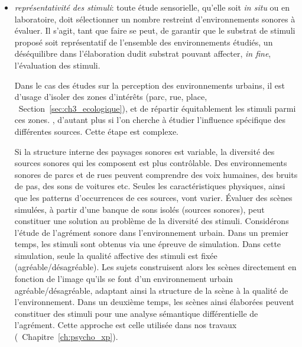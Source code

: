 \begin{itemize}
\item \emph{représentativité des stimuli}: toute étude sensorielle, qu'elle soit \emph{in situ} ou en laboratoire, doit sélectionner un nombre restreint d'environnements sonores à évaluer. Il s'agit, tant que faire se peut, de garantir que le substrat de stimuli proposé soit représentatif de l'ensemble des environnements étudiés, un déséquilibre dans l'élaboration dudit substrat pouvant affecter, \emph{in fine}, l'évaluation des stimuli. 

Dans le cas des études sur la perception des environnements urbains, il est d'usage d'isoler des zones d’intérêts (parc, rue, place, \cf~Section~\ref{sec:ch3_ecologique}), et de répartir équitablement les stimuli parmi ces zones. , d'autant plus si l'on cherche à étudier l'influence spécifique des différentes sources. Cette étape est complexe.

Si la structure interne des paysages sonores est variable, la diversité des sources sonores qui les composent est plus contrôlable. Des environnements sonores de parcs et de rues peuvent comprendre des voix humaines, des bruits de pas, des sons de voitures etc. Seules les caractéristiques physiques, ainsi que les patterns d'occurrences de ces sources, vont varier. Évaluer des scènes simulées, à partir d'une banque de sons isolés (sources sonores), peut constituer une solution au problème de la diversité des stimuli. Considérons l'étude de l'agrément sonore dans l'environnement urbain. Dans un premier temps, les stimuli sont obtenus via une épreuve de simulation. Dans cette simulation, seule la qualité affective des stimuli est fixée (agréable/désagréable). Les sujets construisent alors les scènes directement en fonction de l'image qu'ils se font d'un environnement urbain agréable/désagréable, adaptant ainsi la structure de la scène à la qualité de l'environnement. Dans un deuxième temps, les scènes ainsi élaborées peuvent constituer des stimuli pour une analyse sémantique différentielle de l'agrément. Cette approche est celle utilisée dans nos travaux (\cf~Chapitre~\ref{ch:psycho_xp}). 


\end{itemize}
